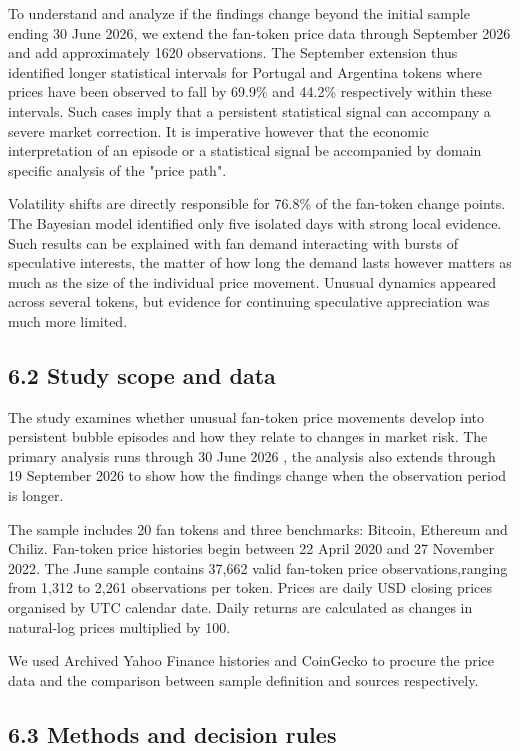 \documentclass[11pt,a4paper,onecolumn]{article}
\begin{document}
To understand and analyze if the findings change beyond the initial sample ending 30 June 2026, we extend the fan-token price data through September 2026 and add approximately 1620 observations. The September extension thus identified longer statistical intervals for Portugal and Argentina tokens where prices have been observed to fall by 69.9\% and 44.2\% respectively within these intervals. Such cases imply that a persistent statistical signal can accompany a severe market correction. It is imperative however that the economic interpretation of an episode or a statistical signal be accompanied by domain specific analysis of the "price path".

Volatility shifts are directly responsible for 76.8\% of the fan-token change points. The Bayesian model identified only five isolated days with strong local evidence. Such results can be explained with fan demand interacting with bursts of speculative interests, the matter of how long the demand lasts however matters as much as the size of the individual price movement. Unusual dynamics appeared across several tokens, but evidence for continuing speculative appreciation was much more limited.

\subsection{6.2 Study scope and data}

The study examines whether unusual fan-token price movements develop into persistent bubble episodes and how they relate to changes in market risk. The primary analysis runs through 30 June 2026 , the analysis also extends through 19 September 2026 to show how the findings change when the observation period is longer.

The sample includes 20 fan tokens and three benchmarks: Bitcoin, Ethereum and Chiliz. Fan-token price histories begin between 22 April 2020 and 27 November 2022. The June sample contains 37,662 valid fan-token price observations,ranging from 1,312 to 2,261 observations per token. Prices are daily USD closing prices organised by UTC calendar date. Daily returns are calculated as changes in natural-log prices multiplied by 100.

We used Archived Yahoo Finance histories and CoinGecko to procure the price data and the comparison between sample definition and sources respectively.

\subsection{6.3 Methods and decision rules}
\end{document}
